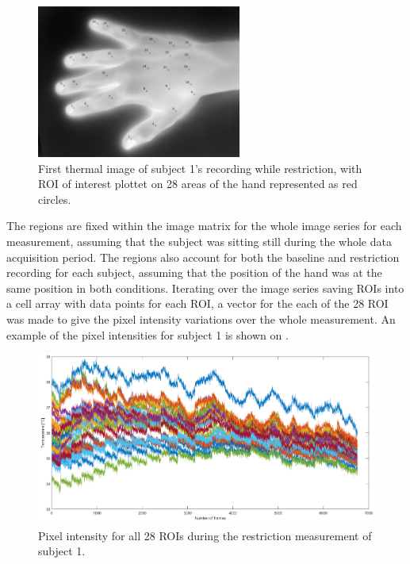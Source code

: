 \begin{figure}[H]
	\includegraphics[width=0.6\textwidth]{figures/roiHand}  %
	\caption{First thermal image of subject 1's recording while restriction, with ROI of interest plottet on 28 areas of the hand represented as red circles.}
	\label{fig:roiHand}  %
\end{figure}

The regions are fixed within the image matrix for the whole image series for each measurement, assuming that the subject was sitting still during the whole data acquisition period. The regions also account for both the baseline and restriction recording for each subject, assuming that the position of the hand was at the same position in both conditions. 
Iterating over the image series saving ROIs into a cell array with data points for each ROI, a vector for the each of the 28 ROI was made to give the pixel intensity variations over the whole measurement. 
An example of the pixel intensities for subject 1 is shown on .

\begin{figure}[H]
	\includegraphics[width=1\textwidth]{figures/Intensities}  %
	\caption{Pixel intensity for all 28 ROIs during the restriction measurement of subject 1.}
	\label{fig:Intensities}  %
\end{figure}

